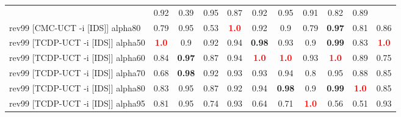 \documentclass{article}
\begin{document}
\begin{tabular}{|l|r@{$\pm$}rr@{$\pm$}rr@{$\pm$}rr@{$\pm$}rr@{$\pm$}rr@{$\pm$}rr@{$\pm$}rr@{$\pm$}rr@{$\pm$}rr@{$\pm$}r|}
& \multicolumn{2}{c}{0.92}
& \multicolumn{2}{c}{0.39}
& \multicolumn{2}{c}{0.95}
& \multicolumn{2}{c}{0.87}
& \multicolumn{2}{c}{0.92}
& \multicolumn{2}{c}{0.95}
& \multicolumn{2}{c}{0.91}
& \multicolumn{2}{c}{0.82}
& \multicolumn{2}{c|}{0.89}
\\
rev99 [CMC-UCT -i [IDS]] alpha80
& \multicolumn{2}{c}{0.79}
& \multicolumn{2}{c}{0.95}
& \multicolumn{2}{c}{0.53}
& \multicolumn{2}{c}{\textbf{\textcolor{red}{1.0}}}
& \multicolumn{2}{c}{0.92}
& \multicolumn{2}{c}{0.9}
& \multicolumn{2}{c}{0.79}
& \multicolumn{2}{c}{\textbf{0.97}}
& \multicolumn{2}{c}{0.81}
& \multicolumn{2}{c|}{0.86}
\\
rev99 [TCDP-UCT -i [IDS]] alpha50
& \multicolumn{2}{c}{\textbf{\textcolor{red}{1.0}}}
& \multicolumn{2}{c}{0.9}
& \multicolumn{2}{c}{0.92}
& \multicolumn{2}{c}{0.94}
& \multicolumn{2}{c}{\textbf{0.98}}
& \multicolumn{2}{c}{0.93}
& \multicolumn{2}{c}{0.9}
& \multicolumn{2}{c}{\textbf{0.99}}
& \multicolumn{2}{c}{0.83}
& \multicolumn{2}{c|}{\textbf{\textcolor{red}{1.0}}}
\\
rev99 [TCDP-UCT -i [IDS]] alpha60
& \multicolumn{2}{c}{0.84}
& \multicolumn{2}{c}{\textbf{0.97}}
& \multicolumn{2}{c}{0.87}
& \multicolumn{2}{c}{0.94}
& \multicolumn{2}{c}{\textbf{\textcolor{red}{1.0}}}
& \multicolumn{2}{c}{\textbf{\textcolor{red}{1.0}}}
& \multicolumn{2}{c}{0.93}
& \multicolumn{2}{c}{\textbf{\textcolor{red}{1.0}}}
& \multicolumn{2}{c}{0.89}
& \multicolumn{2}{c|}{0.75}
\\
rev99 [TCDP-UCT -i [IDS]] alpha70
& \multicolumn{2}{c}{0.68}
& \multicolumn{2}{c}{\textbf{0.98}}
& \multicolumn{2}{c}{0.92}
& \multicolumn{2}{c}{0.93}
& \multicolumn{2}{c}{0.93}
& \multicolumn{2}{c}{0.94}
& \multicolumn{2}{c}{0.8}
& \multicolumn{2}{c}{0.95}
& \multicolumn{2}{c}{0.88}
& \multicolumn{2}{c|}{0.85}
\\
rev99 [TCDP-UCT -i [IDS]] alpha80
& \multicolumn{2}{c}{0.83}
& \multicolumn{2}{c}{0.95}
& \multicolumn{2}{c}{0.87}
& \multicolumn{2}{c}{0.92}
& \multicolumn{2}{c}{0.94}
& \multicolumn{2}{c}{\textbf{0.98}}
& \multicolumn{2}{c}{0.9}
& \multicolumn{2}{c}{\textbf{0.99}}
& \multicolumn{2}{c}{\textbf{\textcolor{red}{1.0}}}
& \multicolumn{2}{c|}{0.85}
\\
rev99 [TCDP-UCT -i [IDS]] alpha95
& \multicolumn{2}{c}{0.81}
& \multicolumn{2}{c}{0.95}
& \multicolumn{2}{c}{0.74}
& \multicolumn{2}{c}{0.93}
& \multicolumn{2}{c}{0.64}
& \multicolumn{2}{c}{0.71}
& \multicolumn{2}{c}{\textbf{\textcolor{red}{1.0}}}
& \multicolumn{2}{c}{0.56}
& \multicolumn{2}{c}{0.51}
& \multicolumn{2}{c|}{0.93}
\\
\hline
\end{tabular}%
\end{document}
